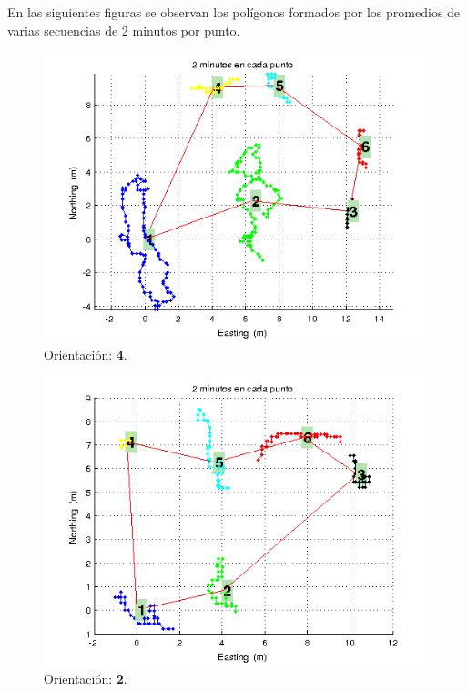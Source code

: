 \documentclass[spanish,12pt,a4paper,titlepage]{report}
\begin{document}
En las siguientes figuras se observan los polígonos formados por los promedios de varias secuencias de 2 minutos por punto. 

\newpage
\begin{figure}[h!]
  \centering
  \includegraphics[width=.75\textwidth]{./img/2m_or1_pol.png}
  \caption{Orientación: \textbf{4}.}
\vspace{-30pt}
  \label{fig:2m_or1_pol.png}
\end{figure}

\begin{figure}[h!]
  \centering
  \includegraphics[width=.75\textwidth]{./img/2m_or2_pol.png}
  \caption{Orientación: \textbf{2}.}
\vspace{-30pt}
  \label{fig:2m_or2_pol.png}
\end{figure}
\end{document}
